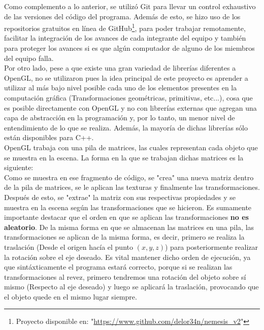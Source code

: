 \documentclass[journal]{IEEEtran}
\begin{document}
Como complemento a lo anterior, se utilizó Git para llevar un control exhaustivo de las versiones del código del programa. Además de esto, se hizo uso de los repositorios gratuitos en línea de GitHub\footnote{Proyecto disponible en: "\url{https://www.github.com/delor34n/nemesis_v2}"}, para poder trabajar remotamente, facilitar la integración de los avances de cada integrante del equipo y también para proteger los avances si es que algún computador de alguno de los miembros del equipo falla.\\

Por otro lado, pese a que existe una gran variedad de librerías diferentes a OpenGL, no se utilizaron pues la idea principal de este proyecto es aprender a utilizar al más bajo nivel posible cada uno de los elementos presentes en la computación gráfica (Transformaciones geométricas, primitivas, etc...), cosa que es posible directamente con OpenGL y no con librerías externas que agregan una capa de abstracción en la programación y, por lo tanto, un menor nivel de entendimiento de lo que se realiza. Además, la mayoría de dichas librerías sólo están disponibles para C++.\\

OpenGL trabaja con una pila de matrices, las cuales representan cada objeto que se muestra en la escena. La forma en la que se trabajan dichas matrices es la siguiente:\\

  

Como se muestra en ese fragmento de código, se "crea" una nueva matriz dentro de la pila de matrices, se le aplican las texturas y finalmente las transformaciones. Después de esto, se "extrae" la matriz con sus respectivas propiedades y se muestra en la escena según las transformaciones que se hicieron. Es sumamente importante destacar que el orden en que se aplican las transformaciones \textbf{no es aleatorio}. De la misma forma en que se almacenan las matrices en una pila, las transformaciones se aplican de la misma forma, es decir, primero se realiza la traslación (Desde el origen hacía el punto $(x,y,z)$) para posteriormente realizar la rotación sobre el eje deseado. Es vital mantener dicho orden de ejecución, ya que sintáxticamente el programa estará correcto, porque si se realizan las transformaciones al revez, primero tendremos una rotación del objeto sobre sí mismo (Respecto al eje deseado) y luego se aplicará la traslación, provocando que el objeto quede en el mismo lugar siempre.
\end{document}

